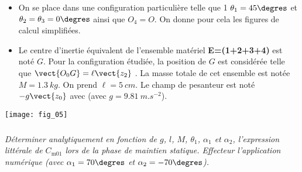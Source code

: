  \ifprof
 \else
\begin{itemize}
\item On se place dans une configuration particulière telle que 1 $\theta_1=45\degres$ et $\theta_2=\theta_3=0\degres$ ainsi que $O_4=O$. On donne pour cela les figures de calcul simplifiées.
\item Le centre d’inertie équivalent de l’ensemble matériel \textbf{E=(1+2+3+4)} est noté $G$.
Pour la configuration étudiée, la position de $G$ est considérée telle que $\vect{O_0G}=\ell\vect{z_2}$ . La masse totale de cet ensemble est notée $M=\SI{1,3}{kg}$. On prend $\ell=\SI{5}{cm}$. Le champ de pesanteur est noté $-g\vect{z_0}$ avec (avec $g=\SI{9,81}{m.s^{-2}}$).
\end{itemize}


\begin{center}
\texttt{[image: fig\_05]}
\end{center}
\fi
\subparagraph{}
\textit{Déterminer analytiquement en fonction de $g$, $l$, $M$, $\theta_1$, $\alpha_1$ et $\alpha_2$, l'expression littérale de $C_{\text{m01}}$ lors de la phase de maintien statique. Effecteur l'application numérique (avec $\alpha_1=70\degres$ et $\alpha_2=-70\degres$).}
\ifprof
